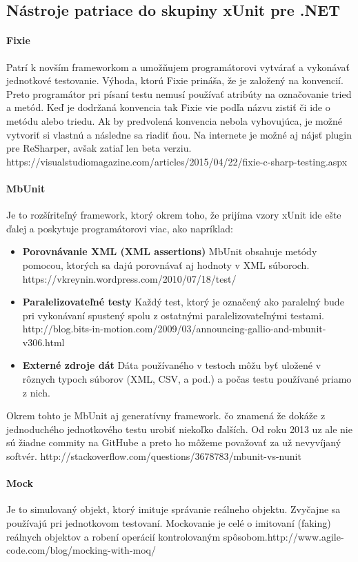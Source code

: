 \documentclass[11pt,twoside,slovak,a4paper]{article}
\begin{document}
		\subsection{Nástroje patriace do skupiny xUnit pre .NET}
			
			\paragraph{Fixie} Patrí k novším frameworkom a umožňujem programátorovi vytvárať a vykonávať jednotkové testovanie. Výhoda, ktorú Fixie prináša, že je založený na konvencií. Preto programátor pri písaní testu nemusí používať atribúty na označovanie tried a metód. Keď je dodržaná konvencia tak Fixie vie podľa názvu zistiť či ide o metódu alebo triedu. Ak by predvolená konvencia nebola vyhovujúca, je možné vytvoriť si vlastnú a následne sa riadiť ňou. Na internete je možné aj nájsť plugin pre ReSharper, avšak zatiaľ len beta verziu. https://visualstudiomagazine.com/articles/2015/04/22/fixie-c-sharp-testing.aspx
			
			\paragraph{MbUnit} Je to rozšíriteľný framework, ktorý okrem toho, že prijíma vzory xUnit ide ešte ďalej a poskytuje programátorovi viac, ako napríklad:
			\begin{itemize}
				\item \textbf{Porovnávanie XML (XML assertions)} MbUnit obsahuje metódy pomocou, ktorých sa dajú porovnávať aj hodnoty v XML súboroch. https://vkreynin.wordpress.com/2010/07/18/test/
				\item \textbf{Paralelizovateľné testy} Každý test, ktorý je označený ako paralelný bude pri vykonávaní spustený spolu z ostatnými paralelizovateľnými testami. http://blog.bits-in-motion.com/2009/03/announcing-gallio-and-mbunit-v306.html
				\item \textbf{Externé zdroje dát} Dáta používaného v testoch môžu byť uložené v rôznych typoch súborov (XML, CSV, a pod.) a počas testu používané priamo z nich.
			\end{itemize}
			Okrem tohto je MbUnit aj generatívny framework. čo znamená že dokáže z jednoduchého jednotkového testu urobiť niekoľko ďalších. Od roku 2013 uz ale nie sú žiadne commity na GitHube a preto ho môžeme považovať za už nevyvíjaný softvér. http://stackoverflow.com/questions/3678783/mbunit-vs-nunit
			
			\paragraph{Mock} Je to simulovaný objekt, ktorý imituje správanie reálneho objektu. Zvyčajne sa používajú pri jednotkovom testovaní. Mockovanie je celé o imitovaní (faking) reálnych objektov a robení operácií kontrolovaným spôsobom.http://www.agile-code.com/blog/mocking-with-moq/
			
\end{document}
